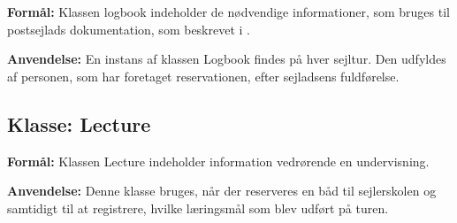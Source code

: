 \textbf{Formål:}
Klassen logbook indeholder de nødvendige informationer, som bruges til postsejlads dokumentation, som beskrevet i .

\textbf{Anvendelse:}
En instans af klassen Logbook findes på hver sejltur. 
Den udfyldes af personen, som har foretaget reservationen, efter sejladsens fuldførelse. 

\subsection*{Klasse: Lecture}

\textbf{Formål:}
Klassen Lecture indeholder information vedrørende en undervisning. 

\textbf{Anvendelse:}
Denne klasse bruges, når der reserveres en båd til sejlerskolen og samtidigt til at registrere, hvilke læringsmål som blev udført på turen. 

